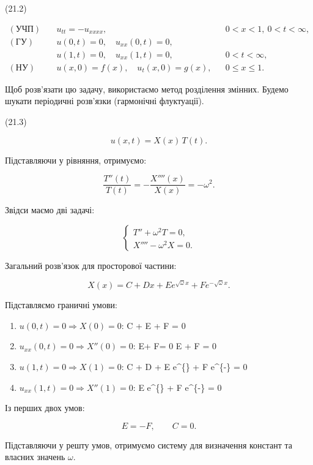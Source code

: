 \documentclass[
  ukrainian,
]{article}
\begin{document}
(21.2)

\[
\begin{aligned}
(\text{УЧП})\quad & u_{tt} = -u_{xxxx}, && 0 < x < 1,\ 0 < t < \infty, \\
(\text{ГУ})\quad & u(0,t) = 0,\quad u_{xx}(0,t) = 0, \\
& u(1,t) = 0,\quad u_{xx}(1,t) = 0, && 0 < t < \infty, \\
(\text{НУ})\quad & u(x,0) = f(x), \quad u_t(x,0) = g(x), && 0 \leqslant x \leqslant 1.
\end{aligned}
\]

Щоб розв'язати цю задачу, використаємо метод розділення змінних. Будемо
шукати періодичні розв'язки (гармонічні флуктуації).

(21.3)

\[
u(x,t) = X(x)\,T(t).
\]

Підставляючи у рівняння, отримуємо:

\[
\frac{T''(t)}{T(t)} = -\frac{X''''(x)}{X(x)} = -\omega^2.
\]

Звідси маємо дві задачі:

\[
\begin{cases}
T'' + \omega^2 T = 0, \\
X'''' - \omega^2 X = 0.
\end{cases}
\]

Загальний розв'язок для просторової частини:

\[
X(x) = C + Dx + E e^{\sqrt{\omega}x} + F e^{-\sqrt{\omega}x}.
\]

Підставляємо граничні умови:

\begin{enumerate}
\def\labelenumi{\arabic{enumi}.}
\item
  \(u(0,t)=0 \Rightarrow X(0)=0\): C + E + F = 0
\item
  \(u_{xx}(0,t)=0 \Rightarrow X''(0)=0\): E\omega + F\omega = 0
  \Rightarrow E + F = 0
\item
  \(u(1,t)=0 \Rightarrow X(1)=0\): C + D + E e\^{}\{\sqrt{\omega}\} + F
  e\^{}\{-\sqrt{\omega}\} = 0
\item
  \(u_{xx}(1,t)=0 \Rightarrow X''(1)=0\): E e\^{}\{\sqrt{\omega}\} + F
  e\^{}\{-\sqrt{\omega}\} = 0
\end{enumerate}

Із перших двох умов:

\[
E = -F, \qquad C = 0.
\]

Підставляючи у решту умов, отримуємо систему для визначення констант та
власних значень \(\omega\).
\end{document}
